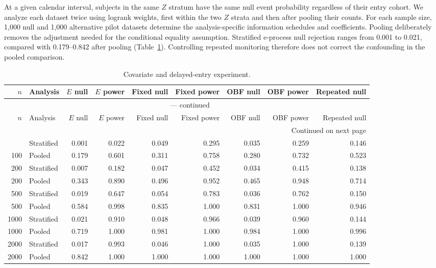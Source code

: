 \documentclass[12pt]{article}
\theoremstyle{definition}
\theoremstyle{remark}
\begin{document}
At a given calendar interval, subjects in the same $Z$ stratum have the same null event probability regardless of their entry cohort. We analyze each dataset twice using logrank weights, first within the two $Z$ strata and then after pooling their counts. For each sample size, 1,000 null and 1,000 alternative pilot datasets determine the analysis-specific information schedules and coefficients. Pooling deliberately removes the adjustment needed for the conditional equality assumption. Stratified e-process null rejection ranges from 0.001 to 0.021, compared with 0.179--0.842 after pooling (Table~\ref{tab:covariate}). Controlling repeated monitoring therefore does not correct the confounding in the pooled comparison.
\par
\begingroup
\scriptsize
\setlength{\tabcolsep}{3pt}
\renewcommand{\arraystretch}{1.10}
\setlength{\LTcapwidth}{\textwidth}
\begin{longtable}{rlrrrrrrr}
\caption{Covariate and delayed-entry experiment.}\label{tab:covariate}\\
\toprule
$n$ & Analysis & $E$ null & $E$ power & Fixed null & Fixed power & OBF null & OBF power & Repeated null \\
\midrule
\endfirsthead
\multicolumn{9}{c}{\tablename\ \thetable{} --- continued}\\
\toprule
$n$ & Analysis & $E$ null & $E$ power & Fixed null & Fixed power & OBF null & OBF power & Repeated null \\
\midrule
\endhead
\midrule
\multicolumn{9}{r}{Continued on next page}\\
\endfoot
\bottomrule
\endlastfoot
100 & Stratified & 0.001 & 0.022 & 0.049 & 0.295 & 0.035 & 0.259 & 0.146 \\
100 & Pooled & 0.179 & 0.601 & 0.311 & 0.758 & 0.280 & 0.732 & 0.523 \\
200 & Stratified & 0.007 & 0.182 & 0.047 & 0.452 & 0.034 & 0.415 & 0.138 \\
200 & Pooled & 0.343 & 0.890 & 0.496 & 0.952 & 0.465 & 0.948 & 0.714 \\
500 & Stratified & 0.019 & 0.647 & 0.054 & 0.783 & 0.036 & 0.762 & 0.150 \\
500 & Pooled & 0.584 & 0.998 & 0.835 & 1.000 & 0.831 & 1.000 & 0.946 \\
1000 & Stratified & 0.021 & 0.910 & 0.048 & 0.966 & 0.039 & 0.960 & 0.144 \\
1000 & Pooled & 0.719 & 1.000 & 0.981 & 1.000 & 0.984 & 1.000 & 0.996 \\
2000 & Stratified & 0.017 & 0.993 & 0.046 & 1.000 & 0.035 & 1.000 & 0.139 \\
2000 & Pooled & 0.842 & 1.000 & 1.000 & 1.000 & 1.000 & 1.000 & 1.000 \\
\end{longtable}
\endgroup
\end{document}
